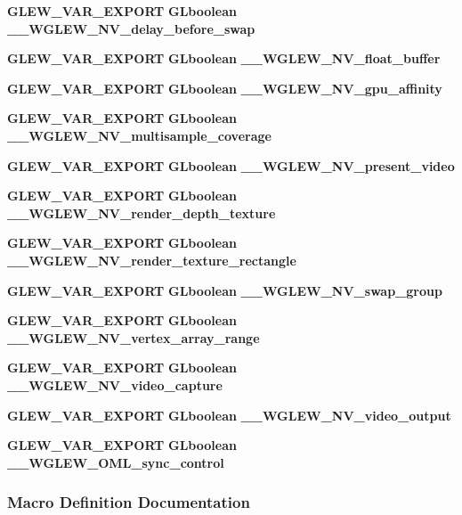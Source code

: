 \begin{DoxyCompactItemize}
\item 
{\bf G\+L\+E\+W\+\_\+\+V\+A\+R\+\_\+\+E\+X\+P\+O\+RT} {\bf G\+Lboolean} {\bf \+\_\+\+\_\+\+W\+G\+L\+E\+W\+\_\+\+N\+V\+\_\+delay\+\_\+before\+\_\+swap}
\item 
{\bf G\+L\+E\+W\+\_\+\+V\+A\+R\+\_\+\+E\+X\+P\+O\+RT} {\bf G\+Lboolean} {\bf \+\_\+\+\_\+\+W\+G\+L\+E\+W\+\_\+\+N\+V\+\_\+float\+\_\+buffer}
\item 
{\bf G\+L\+E\+W\+\_\+\+V\+A\+R\+\_\+\+E\+X\+P\+O\+RT} {\bf G\+Lboolean} {\bf \+\_\+\+\_\+\+W\+G\+L\+E\+W\+\_\+\+N\+V\+\_\+gpu\+\_\+affinity}
\item 
{\bf G\+L\+E\+W\+\_\+\+V\+A\+R\+\_\+\+E\+X\+P\+O\+RT} {\bf G\+Lboolean} {\bf \+\_\+\+\_\+\+W\+G\+L\+E\+W\+\_\+\+N\+V\+\_\+multisample\+\_\+coverage}
\item 
{\bf G\+L\+E\+W\+\_\+\+V\+A\+R\+\_\+\+E\+X\+P\+O\+RT} {\bf G\+Lboolean} {\bf \+\_\+\+\_\+\+W\+G\+L\+E\+W\+\_\+\+N\+V\+\_\+present\+\_\+video}
\item 
{\bf G\+L\+E\+W\+\_\+\+V\+A\+R\+\_\+\+E\+X\+P\+O\+RT} {\bf G\+Lboolean} {\bf \+\_\+\+\_\+\+W\+G\+L\+E\+W\+\_\+\+N\+V\+\_\+render\+\_\+depth\+\_\+texture}
\item 
{\bf G\+L\+E\+W\+\_\+\+V\+A\+R\+\_\+\+E\+X\+P\+O\+RT} {\bf G\+Lboolean} {\bf \+\_\+\+\_\+\+W\+G\+L\+E\+W\+\_\+\+N\+V\+\_\+render\+\_\+texture\+\_\+rectangle}
\item 
{\bf G\+L\+E\+W\+\_\+\+V\+A\+R\+\_\+\+E\+X\+P\+O\+RT} {\bf G\+Lboolean} {\bf \+\_\+\+\_\+\+W\+G\+L\+E\+W\+\_\+\+N\+V\+\_\+swap\+\_\+group}
\item 
{\bf G\+L\+E\+W\+\_\+\+V\+A\+R\+\_\+\+E\+X\+P\+O\+RT} {\bf G\+Lboolean} {\bf \+\_\+\+\_\+\+W\+G\+L\+E\+W\+\_\+\+N\+V\+\_\+vertex\+\_\+array\+\_\+range}
\item 
{\bf G\+L\+E\+W\+\_\+\+V\+A\+R\+\_\+\+E\+X\+P\+O\+RT} {\bf G\+Lboolean} {\bf \+\_\+\+\_\+\+W\+G\+L\+E\+W\+\_\+\+N\+V\+\_\+video\+\_\+capture}
\item 
{\bf G\+L\+E\+W\+\_\+\+V\+A\+R\+\_\+\+E\+X\+P\+O\+RT} {\bf G\+Lboolean} {\bf \+\_\+\+\_\+\+W\+G\+L\+E\+W\+\_\+\+N\+V\+\_\+video\+\_\+output}
\item 
{\bf G\+L\+E\+W\+\_\+\+V\+A\+R\+\_\+\+E\+X\+P\+O\+RT} {\bf G\+Lboolean} {\bf \+\_\+\+\_\+\+W\+G\+L\+E\+W\+\_\+\+O\+M\+L\+\_\+sync\+\_\+control}
\end{DoxyCompactItemize}


\subsubsection{Macro Definition Documentation}
